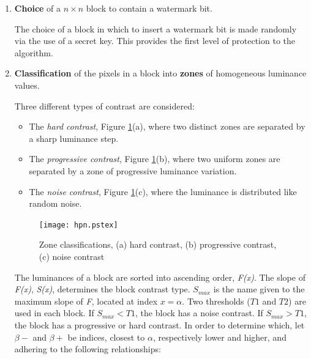 \documentclass[12pt]{report}
\begin{document}
    \begin{enumerate}
	\item {\bf Choice} of a $n \times n$ block to contain a watermark bit.
		
		The choice of a block in which to insert a watermark bit is made randomly via the use of a secret key.
		This provides the first level of protection to the algorithm.				
		
	\item {\bf Classification} of the pixels in a block into {\bf zones} of homogeneous luminance values.
	
		Three different types of contrast are considered:

		\begin{itemize}
			\item The \emph{hard contrast}, Figure \ref{figContrastZones}(a), where two distinct zones are separated by
			a sharp luminance step.
	
			\item The \emph{progressive contrast}, Figure \ref{figContrastZones}(b), where two uniform zones are separated by
			a zone of progressive luminance variation.

			\item The \emph{noise contrast}, Figure \ref{figContrastZones}(c), where the luminance is distributed like random 
			noise.
	
		\end{itemize}
	
		\begin{figure}[htb]
			\begin{center}
				\texttt{[image: hpn.pstex]}
				\caption{Zone classifications, (a) hard contrast, (b) progressive contrast, (c) noise contrast}
				\label{figContrastZones}
			\end{center}
		\end{figure}
		
		The luminances of a block are sorted into ascending order, \emph{F(x)}. The slope of \emph{F(x)}, \emph{S(x)},
		determines the block contrast type. $S_{max}$ is the name given to the maximum slope of \emph{F}, located at index $x=\alpha$.
		Two thresholds ($T1$ and $T2$) are used in each block.
		If $S_{max} < T1$, the block has a noise contrast. If $S_{max} > T1$, the block has a progressive or hard contrast. In order to determine
		which, let $\beta-$ and $\beta+$ be indices, closest to $\alpha$, respectively lower and higher, and adhering to the following 
		relationships:


\end{enumerate}
\end{document}
